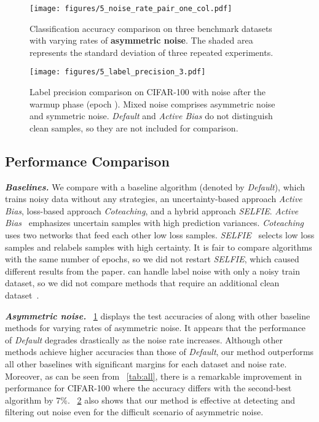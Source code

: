 \begin{figure}[t]
\centering
\texttt{[image: figures/5\_noise\_rate\_pair\_one\_col.pdf]} 
\caption{Classification accuracy comparison on three benchmark datasets with varying rates of \textbf{asymmetric noise}. The shaded area represents the standard deviation of three repeated experiments.
\label{fig:asymmetric_noise_rate}}
\vspace{0.2em}
\end{figure}


\begin{figure}[t]
\centering
\texttt{[image: figures/5\_label\_precision\_3.pdf]} 
\caption{Label precision comparison on CIFAR-100 with  noise after the warmup phase (epoch ). Mixed noise comprises  asymmetric noise and  symmetric noise. \textit{Default} and \textit{Active Bias} do not distinguish clean samples, so they are not included for comparison.
}
\label{fig:precision}
\end{figure}



\subsection{Performance Comparison}

\noindent\emph{\textbf{Baselines.}}
We compare \prgname{} with a baseline algorithm (denoted by \textit{Default}), which trains noisy data without any strategies, an uncertainty-based approach \textit{Active Bias}, loss-based approach \textit{Coteaching}, and a hybrid approach \textit{SELFIE}. \textit{Active Bias}~\cite{chang2017active} emphasizes uncertain samples with high prediction variances. \textit{Coteaching}~\cite{han2018co} uses two networks that feed each other low loss samples. \textit{SELFIE}~\cite{song2019selfie} selects low loss samples and relabels samples with high certainty. It is fair to compare algorithms with the same number of epochs, so we did not restart \textit{SELFIE}, which caused different results from the paper. \prgname{} can handle label noise with only a noisy train dataset, so we did not compare methods that require an additional clean dataset~\cite{shu2019meta}.


\noindent\emph{\textbf{Asymmetric noise.}}
\figurename~\ref{fig:asymmetric_noise_rate} displays the test accuracies of \prgname{} along with other baseline methods for varying rates of asymmetric noise. It appears that the performance of \textit{Default} degrades drastically as the noise rate increases. Although other methods achieve higher accuracies than those of \textit{Default}, our method outperforms all other baselines with significant margins for each dataset and noise rate. Moreover, as can be seen from \tablename~\ref{tab:all}, there is a remarkable improvement in performance for CIFAR-100 where the accuracy differs with the second-best algorithm by 7\%. \figurename~\ref{fig:precision} also shows that our method is effective at detecting and filtering out noise even for the difficult scenario of asymmetric noise. 


